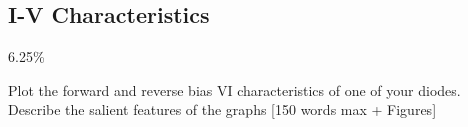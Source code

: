 \subsection{I-V Characteristics}
\label{sec:test:iv}

6.25\%

Plot the forward and reverse bias VI characteristics of one of your diodes. Describe the salient features of the graphs [150 words max + Figures]
